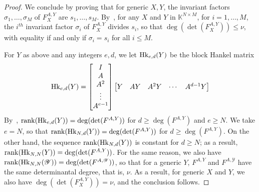 \documentclass[12pt]{article}
\def\K{\mathbb{K}}
\def\scrY{\mathscr{Y}}
\begin{document}
\begin{proof}
We conclude by proving that for generic $X,Y$, the invariant factors
$\sigma_1,\dots,\sigma_M$ of $F_X^{A,Y}$ are $s_1,\dots,s_M$.
By~\cite[Theorem~2.12]{KaVi04}, for any $X$ and $Y$ in $\K^{N\times
  M}$, for $i=1,\dots,M$, the $i^{th}$ invariant factor $\sigma_i$ of
$F_X^{A,Y}$ divides $s_i$, so that $\deg(\det(F_X^{A,Y}))\le\nu$, with
equality if and only if $\sigma_i=s_i$ for all $i \le M$.

For $Y$ as above and any integers $e,d$, we let ${\rm Hk}_{e,d}(Y)$ be
the block Hankel matrix
$$ {\rm Hk}_{e,d}(Y) =
\begin{bmatrix}
I \\  A \\  A^2 \\ \vdots  \\  A^{e-1}
\end{bmatrix}
\begin{bmatrix}
Y & AY & A^2Y &\cdots&  A^{d-1}Y
\end{bmatrix}
$$ By~\cite[Eq.~(2.6)]{KaVi04}, ${\rm rank}({\rm Hk}_{e,d}(Y)) =
\deg(\det(F^{A,Y}))$ for $d \ge \deg(F^{A,Y})$ and $e \ge N$.  We take
$e=N$, so that ${\rm rank}({\rm Hk}_{N,d}(Y)) = \deg(\det(F^{A,Y}))$
for $d \ge \deg(F^{A,Y})$. On the other hand, the sequence ${\rm
  rank}({\rm Hk}_{N,d}(Y))$ is constant for $d \ge N$; as a result,
${\rm rank}({\rm Hk}_{N,N}(Y)) = \deg(\det(F^{A,Y}))$. For the same
reason, we also have ${\rm rank}({\rm Hk}_{N,N}(\scrY)) =
\deg(\det(F^{A,\scrY}))$, so that for a generic $Y$, $F^{A,Y}$ and
$F^{A,\scrY}$ have the same determinantal degree, that is, $\nu$.  As
a result, for generic $X$ and $Y$, we also have
$\deg(\det(F_X^{A,Y}))=\nu$, and the conclusion follows.
\end{proof}




\end{document}
